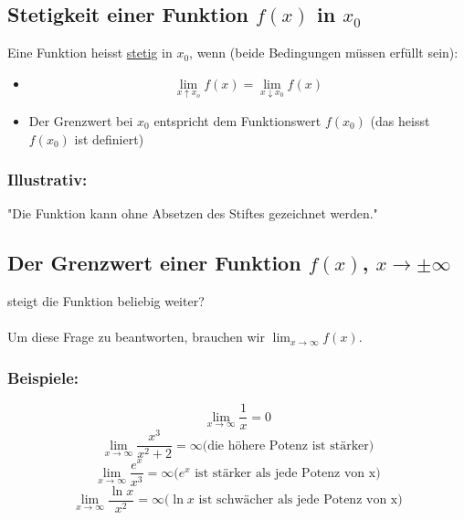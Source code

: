 \documentclass[11pt]{amsart}
\theoremstyle{remark}
\begin{document}
\subsection{Stetigkeit einer Funktion $f(x)$ in $x_0$}
Eine Funktion heisst \underline{stetig} in $x_0$, wenn (beide Bedingungen m\"ussen erf\"ullt sein):\\
\begin{itemize}
\item[] \begin{equation*}
\lim_{x \uparrow x_o} f(x) = \lim_{x \downarrow x_0} f(x)
\end{equation*}
\item[] Der Grenzwert bei $x_0$ entspricht dem Funktionswert $f(x_0)$ (das heisst $f(x_0)$ ist definiert)\end{itemize}
\subsubsection*{Illustrativ:}
"Die Funktion kann ohne Absetzen des Stiftes gezeichnet werden."
\subsection{Der Grenzwert einer Funktion $f(x)$, $x\to\pm\infty$}
\begin{figure}[h]
  \centering
 \end{figure}
steigt die Funktion beliebig weiter?\\\\
Um diese Frage zu beantworten, brauchen wir $\lim_{x\to\infty} f(x)$.
\subsubsection*{Beispiele:}
\begin{equation}
\lim_{x\to\infty} \frac 1x = 0
\end{equation}
\begin{equation}
\lim_{x\to\infty} \frac {x^3}{x^2+2} = \infty \text{(die h\"ohere Potenz ist st\"arker)}
\end{equation}
\begin{equation}
\lim_{x\to\infty} \frac {e^x}{x^3} = \infty \text{($e^x$ ist st\"arker als jede Potenz von x)}
\end{equation}
\begin{equation}
\lim_{x\to\infty} \frac {\ln x}{x^2} = \infty \text{($\ln x$ ist schw\"acher als jede Potenz von x)}
\end{equation}
\end{document}
